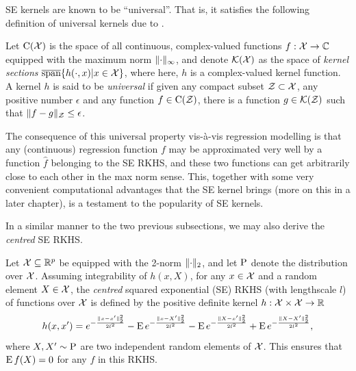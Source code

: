 
SE kernels are known to be ``universal''. That is, it satisfies the following definition of universal kernels due to \citet{micchelli2006universal}.

\begin{definition}
  Let $\text{C}({\mathcal X})$ is the space of all continuous, complex-valued functions $f:{\mathcal X}\to\mathbb{C}$ equipped with the maximum norm $\lVert\cdot\rVert_\infty$, and denote ${\mathcal K}({\mathcal X})$ as the space of \emph{kernel sections} $ \overline{\text{span}}\{ h(\cdot,x) | x \in {\mathcal X} \}$, where here, $h$ is a complex-valued kernel function.
  A kernel $h$ is said to be \emph{universal} if given any compact subset ${\mathcal Z} \subset {\mathcal X}$, any positive number $\epsilon$ and any function $f \in \text{C}({\mathcal Z})$, there is a function $g \in {\mathcal K}({\mathcal Z})$ such that $\lVert f-g\rVert_{\mathcal Z} \leq \epsilon$.
\end{definition}

The consequence of this universal property vis-à-vis regression modelling is that any (continuous) regression function $f$ may be approximated very well by a function $\hat f$ belonging to the SE RKHS, and these two functions can get arbitrarily close to each other in the max norm sense.
This, together with some very convenient computational advantages that the SE kernel brings (more on this in a later chapter), is a testament to the popularity of SE kernels.

In a similar manner to the two previous subsections, we may also derive the \emph{centred} SE RKHS. 

\begin{definition}
  Let ${\mathcal X} \subseteq \mathbb{R}^p$ be equipped with the 2-norm $\lVert\cdot\rVert_2$, and let $\operatorname{P}$ denote the distribution over ${\mathcal X}$.
  Assuming integrability of $h(x,X)$, for any $x\in{\mathcal X}$ and a random element $X\in{\mathcal X}$, the \emph{centred} squared exponential (SE) RKHS (with lengthscale $l$) of functions over ${\mathcal X}$ is defined by the positive definite kernel $h:{\mathcal X}\times{\mathcal X}\to\mathbb{R}$ 
  \[
    h(x,x') = e^{-\frac{\lVert x-x'\rVert_2^2}{2l^2}} - \operatorname{E} e^{-\frac{\lVert x-X'\rVert_2^2}{2l^2}} - \operatorname{E} e^{-\frac{\lVert X-x'\rVert_2^2}{2l^2}} + \operatorname{E} e^{-\frac{\lVert X-X'\rVert_2^2}{2l^2}},
  \]
  where $X,X'\sim\operatorname{P}$ are two independent random elements of ${\mathcal X}$. 
  This ensures that $\operatorname{E} f(X) = 0$ for any $f$ in this RKHS.
\end{definition}


